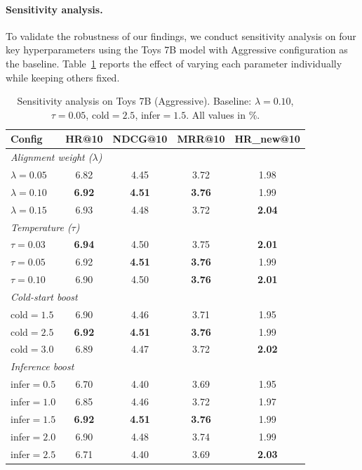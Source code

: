 \paragraph{Sensitivity analysis.}
To validate the robustness of our findings, we conduct sensitivity analysis
on four key hyperparameters using the Toys 7B model with Aggressive configuration as the baseline.
Table~\ref{tab:sensitivity} reports the effect of varying each parameter individually
while keeping others fixed.

\begin{table}[t]
\caption{Sensitivity analysis on Toys 7B (Aggressive). Baseline: $\lambda{=}0.10$, $\tau{=}0.05$, cold${=}2.5$, infer${=}1.5$. All values in \%.}
\label{tab:sensitivity}
\centering
\scriptsize
\begin{tabular}{lcccc}
\toprule
\textbf{Config} & \textbf{HR@10} & \textbf{NDCG@10} & \textbf{MRR@10} & \textbf{HR\_new@10} \\
\midrule
\multicolumn{5}{l}{\footnotesize\textit{Alignment weight ($\lambda$)}} \\
$\lambda{=}0.05$ & 6.82 & 4.45 & 3.72 & 1.98 \\
$\lambda{=}0.10$ & \textbf{6.92} & \textbf{4.51} & \textbf{3.76} & 1.99 \\
$\lambda{=}0.15$ & 6.93 & 4.48 & 3.72 & \textbf{2.04} \\
\midrule
\multicolumn{5}{l}{\footnotesize\textit{Temperature ($\tau$)}} \\
$\tau{=}0.03$ & \textbf{6.94} & 4.50 & 3.75 & \textbf{2.01} \\
$\tau{=}0.05$ & 6.92 & \textbf{4.51} & \textbf{3.76} & 1.99 \\
$\tau{=}0.10$ & 6.90 & 4.50 & \textbf{3.76} & \textbf{2.01} \\
\midrule
\multicolumn{5}{l}{\footnotesize\textit{Cold-start boost}} \\
cold${=}1.5$ & 6.90 & 4.46 & 3.71 & 1.95 \\
cold${=}2.5$ & \textbf{6.92} & \textbf{4.51} & \textbf{3.76} & 1.99 \\
cold${=}3.0$ & 6.89 & 4.47 & 3.72 & \textbf{2.02} \\
\midrule
\multicolumn{5}{l}{\footnotesize\textit{Inference boost}} \\
infer${=}0.5$ & 6.70 & 4.40 & 3.69 & 1.95 \\
infer${=}1.0$ & 6.85 & 4.46 & 3.72 & 1.97 \\
infer${=}1.5$ & \textbf{6.92} & \textbf{4.51} & \textbf{3.76} & 1.99 \\
infer${=}2.0$ & 6.90 & 4.48 & 3.74 & 1.99 \\
infer${=}2.5$ & 6.71 & 4.40 & 3.69 & \textbf{2.03} \\
\bottomrule
\end{tabular}
\end{table}

